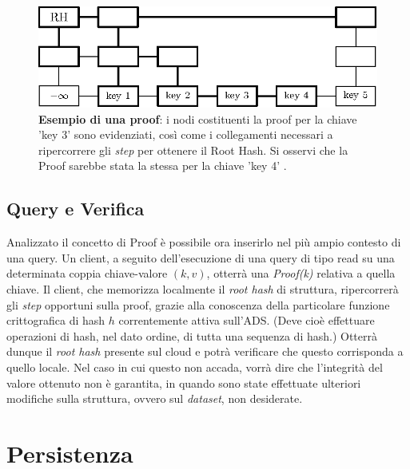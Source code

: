 	\begin{figure}
		\centering
		\includegraphics[scale=0.8]{figure/proofExample.eps}
		\caption{\textbf{Esempio di una proof}: i nodi costituenti la proof per la chiave 'key 3' sono evidenziati, così come i collegamenti necessari a ripercorrere gli \textit{step} per ottenere il Root Hash. Si osservi che la Proof sarebbe stata la stessa per la chiave 'key 4' .}\label{fig:9}
	\end{figure}
 		
	\subsection{Query e Verifica}
	
	
		Analizzato il concetto di Proof è possibile ora inserirlo nel più ampio contesto di una query. Un client, a seguito dell'esecuzione di una query di tipo read su una determinata coppia chiave-valore $ (k,v) $, otterrà una \textit{Proof(k)} relativa a quella chiave. Il client, che memorizza localmente il \textit{root hash} di struttura, ripercorrerà gli \textit{step} opportuni sulla proof, grazie alla conoscenza della particolare funzione crittografica di hash $ h $ correntemente attiva sull'ADS. (Deve cioè effettuare operazioni di hash, nel dato ordine, di tutta una sequenza di hash.) Otterrà dunque il \textit{root hash} presente sul cloud e potrà verificare che questo corrisponda a quello locale. Nel caso in cui questo non accada, vorrà dire che l'integrità del valore ottenuto non è garantita, in quando sono state effettuate ulteriori modifiche sulla struttura, ovvero sul \textit{dataset}, non desiderate.
			
	
\section{Persistenza}


